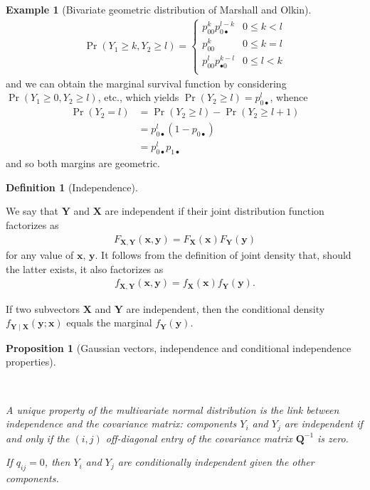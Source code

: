 \documentclass[
  11pt,
  letterpaper,
]{scrbook}
\theoremstyle{definition}
\theoremstyle{definition}
\newtheorem{example}{Example}[chapter]
\theoremstyle{definition}
\newtheorem{definition}{Definition}[chapter]
\theoremstyle{plain}
\newtheorem{proposition}{Proposition}[chapter]
\theoremstyle{plain}
\theoremstyle{remark}
\begin{document}
\begin{example}[Bivariate geometric distribution of Marshall and
Olkin]
\begin{align*}
\Pr(Y_1 \ge k, Y_2 \ge l) = \begin{cases}
p_{00}^k p_{0 \bullet}^{l-k} & 0\leq k < l\\
p_{00}^k & 0 \leq k=l \\
p_{00}^l p_{\bullet 0}^{k-l} & 0\leq l < k\\
\end{cases}
\end{align*} and we can obtain the marginal survival function by
considering \(\Pr(Y_1 \ge 0, Y_2 \ge l)\), etc., which yields
\(\Pr(Y_2 \ge l) = p_{0 \bullet}^{l}\), whence \begin{align*}
\Pr(Y_2 = l) &= \Pr(Y_2 \ge l) -\Pr(Y_2 \ge l+1)
\\&= p_{0 \bullet}^{l} (1-p_{0 \bullet})
 \\&=p_{0 \bullet}^{l}p_{1\bullet}
\end{align*} and so both margins are geometric.

\end{example}

\begin{definition}[Independence]\protect\hypertarget{def-independence}{}\label{def-independence}

We say that \(\boldsymbol{Y}\) and \(\boldsymbol{X}\) are independent if
their joint distribution function factorizes as \begin{align*}
F_{\boldsymbol{X}, \boldsymbol{Y}}(\boldsymbol{x}, \boldsymbol{y}) = F_{\boldsymbol{X}}(\boldsymbol{x})F_{\boldsymbol{Y}}(\boldsymbol{y})
\end{align*} for any value of \(\boldsymbol{x}\), \(\boldsymbol{y}\). It
follows from the definition of joint density that, should the latter
exists, it also factorizes as \begin{align*}
f_{\boldsymbol{X}, \boldsymbol{Y}}(\boldsymbol{x}, \boldsymbol{y}) = f_{\boldsymbol{X}}(\boldsymbol{x})f_{\boldsymbol{Y}}(\boldsymbol{y}).
\end{align*}

If two subvectors \(\boldsymbol{X}\) and \(\boldsymbol{Y}\) are
independent, then the conditional density
\(f_{\boldsymbol{Y} \mid \boldsymbol{X}}(\boldsymbol{y}; \boldsymbol{x})\)
equals the marginal \(f_{\boldsymbol{Y}}(\boldsymbol{y})\).

\end{definition}

\begin{proposition}[Gaussian vectors, independence and conditional
independence
properties]\protect\hypertarget{prp-independence}{}\label{prp-independence}

~

A unique property of the multivariate normal distribution is the link
between independence and the covariance matrix: components \(Y_i\) and
\(Y_j\) are independent if and only if the \((i,j)\) off-diagonal entry
of the covariance matrix \(\boldsymbol{Q}^{-1}\) is zero.

If \(q_{ij}=0\), then \(Y_i\) and \(Y_j\) are conditionally independent
given the other components.

\end{proposition}
\end{document}
